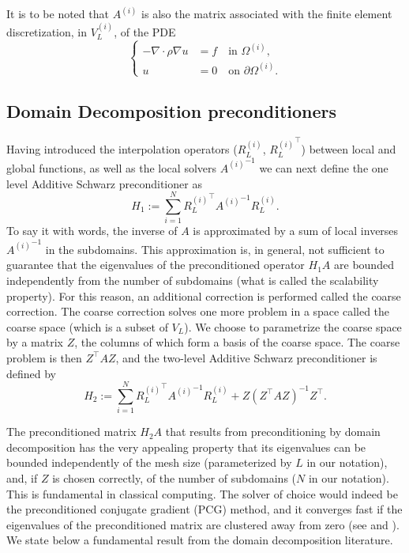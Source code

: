 \documentclass[onefignum,onetabnum]{siamart251216}
\newcommand{\Hone}{H_1}
\newcommand{\Htwo}{H_2}
\begin{document}
It is to be noted that $A^{(i)} $ is also the matrix associated with the finite element discretization, in $V_L^{(i)}$, of the PDE 
\[
\left\{
\begin{aligned}
- \nabla \cdot \rho \nabla u &= f \quad \text{in } \Omega^{(i)}, \\
u &= 0 \quad \text{on } \partial \Omega^{(i)}.
\end{aligned}
\right.
\]

\subsection{Domain Decomposition preconditioners}

Having introduced the interpolation operators (${R_L^{(i)}}$, ${R_L^{(i)}}^\top$) between local and global functions, as well as the local solvers ${A^{(i)}}^{-1}$ we can next define the one level Additive Schwarz preconditioner as
\begin{equation}
\Hone := \sum_{i=1}^N {R_L^{(i)}}^\top {A^{(i)}}^{-1} R_L^{(i)}. 
\end{equation}
To say it with words, the inverse of $A$ is approximated by a sum of local inverses $ {A^{(i)}}^{-1}$ in the subdomains. This approximation is, in general, not sufficient to guarantee that the eigenvalues of the preconditioned operator $\Hone A$ are bounded independently from the number of subdomains (what is called the scalability property). For this reason, an additional correction is performed called the coarse correction. The coarse correction solves one more problem in a space called the coarse space (which is a subset of $V_L$). We choose to parametrize the coarse space by a matrix $Z$, the columns of which form a basis of the coarse space. The coarse problem is then $Z^\top A Z$, and the two-level Additive Schwarz preconditioner is defined by 
\begin{equation}
\label{eq:HASM2}
\Htwo := \sum_{i=1}^N {R_L^{(i)}}^\top {A^{(i)}}^{-1} R_L^{(i)} + Z (Z^\top A Z)^{-1} Z^\top.
\end{equation}

The preconditioned matrix $\Htwo A$ that results from preconditioning by domain decomposition has the very appealing property that its eigenvalues can be bounded independently of the mesh size (parameterized by $L$ in our notation), and, if $Z$ is chosen correctly, of the number of subdomains ($N$ in our notation). This is fundamental in classical computing. The solver of choice would indeed  be the preconditioned conjugate gradient (PCG) method, and it converges fast if the eigenvalues of the preconditioned matrix are clustered away from zero (see \cite[Sec 6.11.3 and Sec. 9.2]{zbMATH01953444} and \cite[Lem. C.10]{zbMATH02113718}). We state below a fundamental result from the domain decomposition literature. 
\end{document}
